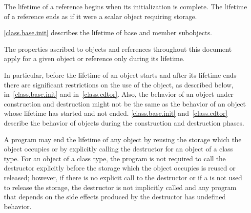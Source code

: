 \pnum
{}%
The lifetime of a reference begins when its initialization is complete.
The lifetime of a reference ends as if it were a scalar object requiring storage.

\pnum
\begin{note} \ref{class.base.init}
describes the lifetime of base and member subobjects. \end{note}

\pnum
The properties ascribed to objects and references throughout this document
apply for a given object or reference only during its lifetime. \begin{note}
In particular, before the lifetime of an object starts and after its
lifetime ends there are significant restrictions on the use of the
object, as described below, in~\ref{class.base.init} and
in~\ref{class.cdtor}. Also, the behavior of an object under construction
and destruction might not be the same as the behavior of an object whose
lifetime has started and not ended. \ref{class.base.init}
and~\ref{class.cdtor} describe the behavior of objects during the
construction and destruction phases. \end{note}

\pnum
A program may end the lifetime of any object by reusing the storage
which the object occupies or by explicitly calling the destructor for an
object of a class type.
For an object of a class type, the program is not required to
call the destructor explicitly before the storage which the object
occupies is reused or released; however, if there is no explicit call to
the destructor or if a 
is not used to release the storage, the destructor is not
implicitly called and any program that depends on the side effects
produced by the destructor has undefined behavior.

